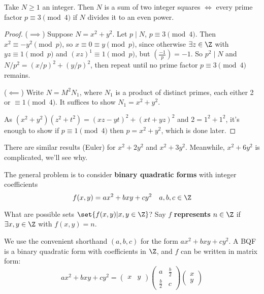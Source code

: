 \documentclass{article}
\newcommand{\legendre}[2]{\genfrac{(}{)}{}{}{#1}{#2}}
\begin{document}
\begin{nthm}
    Take $N \geq 1$ an integer. Then $N$ is a sum of two integer squares $\iff$ every prime factor $p \equiv 3 \pmod{4}$ if $N$ divides it to an even power.
\end{nthm}

\begin{proof}
    ($\implies$) Suppose $N = x^2 + y^2$. Let $p \mid N$, $p \equiv 3 \pmod{4}$.
    Then $x^2 \equiv -y^2 \pmod{p}$, so $x \equiv 0 \equiv y \pmod{p}$, since otherwise $\exists z \in \Z$ with $y z \equiv 1 \pmod{p}$ and $(xz)^1 \equiv 1 \pmod{p}$, but $\legendre{-1}{p} = -1$.
    So $p^2 \mid N$ and $N/p^2 = (x / p)^2 + (y / p)^2$, then repeat until no prime factor $p \equiv 3 \pmod{4}$ remains.

    ($\impliedby$) Write $N = M^2 N_1$, where $N_1$ is a product of distinct primes, each either 2 or $\equiv1 \pmod{4}$.
    It suffices to show $N_1 = x^2 + y^2$.

    As $(x^2 + y^2)(z^2 + t^2) = (xz - yt)^2 + (xt + yz)^2$ and $2 = 1^2 + 1^2$, it's enough to show if $p \equiv 1 \pmod{4}$ then $p = x^2 + y^2$, which is done later.
\end{proof}

There are similar results (Euler) for $x^2 + 2y^2$ and $x^2 + 3y^2$.  Meanwhile, $x^2 + 6y^2$ is complicated, we'll see why.

The general problem is to consider \textbf{binary quadratic forms} with integer coefficients
\begin{equation*}
    f(x, y) = a x^2 + b x y + c y^2 \quad a,b,c \in \Z
\end{equation*}

What are possible sets $\set{f(x, y) | x, y \in \Z}$? Say $f$ \textbf{represents} $n \in \Z$ if $\exists x, y \in \Z$ with $f(x, y) = n$.

We use the convenient shorthand $(a,b,c)$ for the form $a x^2 + b x y + c y^2$.
A BQF is a binary quadratic form with coefficients in $\Z$, and $f$ can be written in matrix form:
\begin{equation*}
    a x^2 + b x y + c y^2 =
    \begin{pmatrix}
        x & y
    \end{pmatrix}
    \begin{pmatrix}
        a & \frac{b}{2} \\
        \frac{b}{2} & c
    \end{pmatrix}
    \begin{pmatrix}
        x \\ y
    \end{pmatrix}
\end{equation*}
\end{document}
